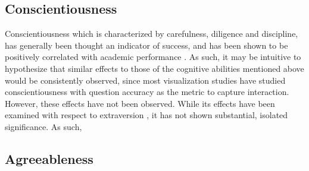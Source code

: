 \documentclass[conference]{IEEEtran}
\begin{document}
\subsection{Conscientiousness}\label{Conscientiousness}
Conscientiousness which is characterized by carefulness, diligence and discipline, has generally
been thought an indicator of success, and has been shown to be positively correlated with
academic performance \cite{ImhofSpaet2013pv}. As such, it may be intuitive to hypothesize
that similar effects to those of the cognitive abilities mentioned above would be consistently
observed, since most visualization studies have studied conscientiousness with question
accuracy as the metric to capture interaction. However, these effects have not been observed.
While its effects have been examined with respect to extraversion \cite{SarsamFirstLook},
it has not shown substantial, isolated significance. As such, 


\subsection{Agreeableness}\label{Agreeableness}


\vspace{12pt}
\end{document}
